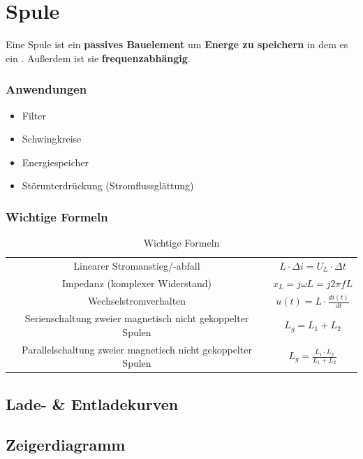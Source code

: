 \newpage

\section{Spule}
Eine Spule ist ein \textbf{passives Bauelement} um \textbf{Energe zu speichern} in dem es ein . Außerdem ist sie \textbf{frequenzabhängig}. 

\subsubsection*{Anwendungen}
\begin{itemize}
    \item Filter
    \item Schwingkreise
    \item Energiespeicher
    \item Störunterdrückung (Stromflussglättung)
\end{itemize}

\subsubsection*{Wichtige Formeln}
\begin{table}[!htb]
    \centering
    \begin{tabular}{|c|c|}
        \hline
        Linearer Stromanstieg/-abfall & $L\cdot \Delta i = U_L \cdot \Delta t$ \\
        Impedanz (komplexer Widerstand) & $x_L = j\omega L = j2\pi fL$ \\
        Wechselstromverhalten & $u(t) = L\cdot \frac{di(t)}{dt}$ \\
        Serienschaltung zweier magnetisch nicht gekoppelter Spulen& $L_{g}=L_1+L_2$ \\
        Parallelschaltung zweier magnetisch nicht gekoppelter Spulen& $L_{g}=\frac{L_1\cdot L_2}{L_1+ L_2}$ \\
        \hline
    \end{tabular}
    \caption{Wichtige Formeln}
\end{table}

\subsection{Lade- \& Entladekurven}

\subsection{Zeigerdiagramm}

